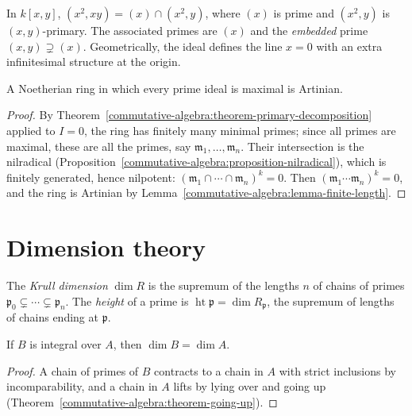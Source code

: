 \begin{example}\label{commutative-algebra:example-embedded-prime}
In $k[x, y]$, $(x^2, xy) = (x) \cap (x^2, y)$, where $(x)$ is prime and $(x^2, y)$ is $(x, y)$-primary. The associated primes are
$(x)$ and the \emph{embedded} prime $(x, y) \supsetneq (x)$. Geometrically, the ideal defines the line $x = 0$ with an extra
infinitesimal structure at the origin.
\end{example}

\begin{corollary}\label{commutative-algebra:corollary-artinian-converse}
A Noetherian ring in which every prime ideal is maximal is Artinian.
\end{corollary}

\begin{proof}
By Theorem~\ref{commutative-algebra:theorem-primary-decomposition} applied to $I = 0$, the ring has finitely many
minimal primes; since all primes are maximal, these are all the primes, say $\mathfrak{m}_1, \ldots, \mathfrak{m}_n$. Their intersection
is the nilradical (Proposition~\ref{commutative-algebra:proposition-nilradical}), which is finitely generated, hence
nilpotent: $(\mathfrak{m}_1 \cap \cdots \cap \mathfrak{m}_n)^k = 0$. Then $(\mathfrak{m}_1 \cdots \mathfrak{m}_n)^k = 0$, and the ring is Artinian by
Lemma~\ref{commutative-algebra:lemma-finite-length}.
\end{proof}

\section{Dimension theory}\label{commutative-algebra:section-dimension}

\begin{definition}\label{commutative-algebra:definition-dimension}
The \emph{Krull dimension} $\dim R$ is the supremum of the lengths $n$ of chains of primes
$\mathfrak{p}_0 \subsetneq \cdots \subsetneq \mathfrak{p}_n$. The \emph{height} of a prime is $\operatorname{ht}\mathfrak{p} = \dim R_\mathfrak{p}$, the supremum of lengths of
chains ending at $\mathfrak{p}$.
\end{definition}

\begin{proposition}\label{commutative-algebra:proposition-dimension-integral}
If $B$ is integral over $A$, then $\dim B = \dim A$.
\end{proposition}

\begin{proof}
A chain of primes of $B$ contracts to a chain in $A$ with strict inclusions by incomparability, and a chain in $A$ lifts by lying
over and going up (Theorem~\ref{commutative-algebra:theorem-going-up}).
\end{proof}

